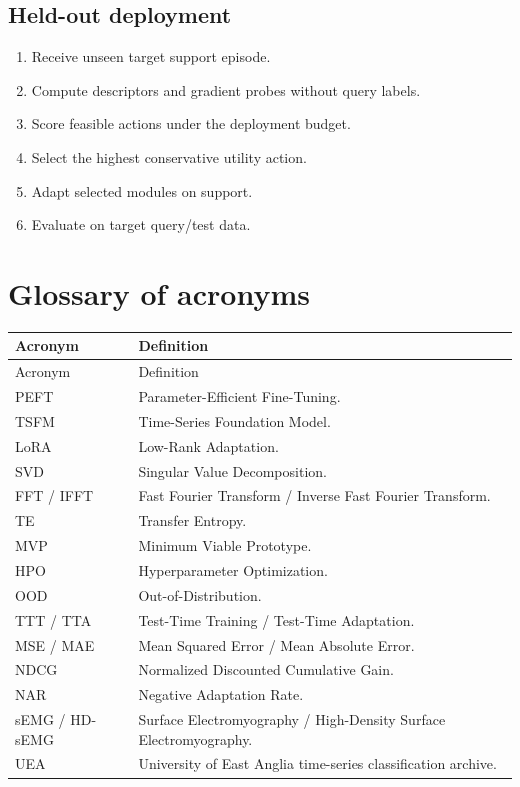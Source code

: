 \documentclass[10pt]{article}
\begin{document}
\subsection{Held-out deployment}

\begin{enumerate}[leftmargin=*, itemsep=1pt]
    \item Receive unseen target support episode.
    \item Compute descriptors and gradient probes without query labels.
    \item Score feasible actions under the deployment budget.
    \item Select the highest conservative utility action.
    \item Adapt selected modules on support.
    \item Evaluate on target query/test data.
\end{enumerate}

\section{Glossary of acronyms}

\begin{longtable}{L{0.17\textwidth}L{0.75\textwidth}}
\toprule
Acronym & Definition \\
\midrule
\endfirsthead
\toprule
Acronym & Definition \\
\midrule
\endhead
PEFT & Parameter-Efficient Fine-Tuning. \\
TSFM & Time-Series Foundation Model. \\
LoRA & Low-Rank Adaptation. \\
SVD & Singular Value Decomposition. \\
FFT / IFFT & Fast Fourier Transform / Inverse Fast Fourier Transform. \\
TE & Transfer Entropy. \\
MVP & Minimum Viable Prototype. \\
HPO & Hyperparameter Optimization. \\
OOD & Out-of-Distribution. \\
TTT / TTA & Test-Time Training / Test-Time Adaptation. \\
MSE / MAE & Mean Squared Error / Mean Absolute Error. \\
NDCG & Normalized Discounted Cumulative Gain. \\
NAR & Negative Adaptation Rate. \\
sEMG / HD-sEMG & Surface Electromyography / High-Density Surface Electromyography. \\
UEA & University of East Anglia time-series classification archive. \\
\bottomrule
\end{longtable}
\end{document}
